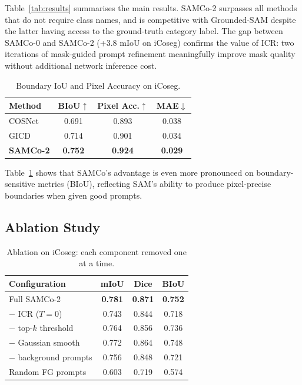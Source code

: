 \documentclass[10pt,twocolumn,letterpaper]{article}
\begin{document}
Table~\ref{tab:results} summarises the main results.
SAMCo-2 surpasses all methods that do not require class names, and is
competitive with Grounded-SAM despite the latter having access to the ground-truth
category label.
The gap between SAMCo-0 and SAMCo-2 (+3.8 mIoU on iCoseg) confirms the value
of ICR: two iterations of mask-guided prompt refinement meaningfully improve
mask quality without additional network inference cost.

\begin{table}[t]
\centering
\caption{Boundary IoU and Pixel Accuracy on iCoseg.}
\label{tab:biou}
\begin{tabular}{@{}lccc@{}}
\toprule
Method & BIoU$\uparrow$ & Pixel Acc.$\uparrow$ & MAE$\downarrow$ \\
\midrule
COSNet               & 0.691 & 0.893 & 0.038 \\
GICD                 & 0.714 & 0.901 & 0.034 \\
\textbf{SAMCo-2}     & \textbf{0.752} & \textbf{0.924} & \textbf{0.029} \\
\bottomrule
\end{tabular}
\end{table}

Table~\ref{tab:biou} shows that SAMCo's advantage is even more pronounced on
boundary-sensitive metrics (BIoU), reflecting SAM's ability to produce
pixel-precise boundaries when given good prompts.

\subsection{Ablation Study}

\begin{table}[t]
\centering
\caption{Ablation on iCoseg: each component removed one at a time.}
\label{tab:ablation}
\begin{tabular}{@{}lccc@{}}
\toprule
Configuration           & mIoU  & Dice  & BIoU \\
\midrule
Full SAMCo-2            & \textbf{0.781} & \textbf{0.871} & \textbf{0.752} \\
$-$ ICR ($T=0$)         & 0.743 & 0.844 & 0.718 \\
$-$ top-$k$ threshold   & 0.764 & 0.856 & 0.736 \\
$-$ Gaussian smooth     & 0.772 & 0.864 & 0.748 \\
$-$ background prompts  & 0.756 & 0.848 & 0.721 \\
Random FG prompts       & 0.603 & 0.719 & 0.574 \\
\bottomrule
\end{tabular}
\end{table}
\end{document}
